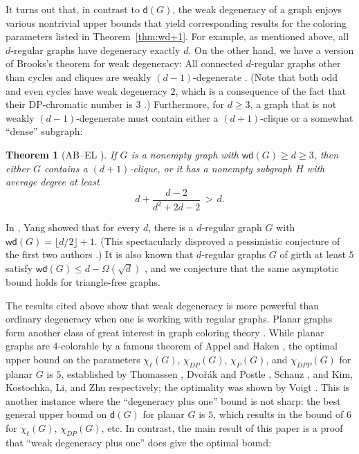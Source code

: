 \documentclass[11pt]{article}
\theoremstyle{slantthm}
\newtheorem{thm}{Theorem}[section]
\numberwithin{equation}{section}
\theoremstyle{definition}
\renewcommand{\epsilon}{\varepsilon}
\renewcommand{\leq}{\leqslant}
\renewcommand{\geq}{\geqslant}
\numberwithin{equation}{section}
\newcommand{\0}{\varnothing}
\newcommand{\de}{\mathsf{d}}
\newcommand{\wde}{\mathsf{wd}}
\begin{document}
    It turns out that, in contrast to $\de(G)$, the weak degeneracy of a graph enjoys various nontrivial upper bounds that yield corresponding results for the coloring parameters listed in Theorem~\ref{thm:wd+1}. For example, as mentioned above, all $d$-regular graphs have degeneracy exactly $d$. On the other hand, we have a version of Brooks's theorem for weak degeneracy: All connected $d$-regular graphs other than cycles and cliques are weakly $(d-1)$-degenerate \cite[Theorem 1.5]{WD}. (Note that both odd and even cycles have weak degeneracy $2$, which is a consequence of the fact that their DP-chromatic number is $3$ \cite{DP}.) Furthermore, for $d \geq 3$, a graph that is not weakly $(d-1)$-degenerate must contain either a $(d+1)$-clique or a somewhat ``dense'' subgraph: %

    \begin{thm}[{AB--EL \cite[Theorem 1.7]{WD}}]
        If $G$ is a nonempty graph with $\wde(G) \geq d \geq 3$, then either $G$ contains a $(d+1)$-clique, or it has a nonempty subgraph $H$ with average degree at least
        \[
            d + \frac{d - 2}{d^2 + 2d - 2} \,>\, d.
        \]
    \end{thm}

    In \cite{Regular}, Yang showed that for every $d$, there is a $d$-regular graph $G$ with $\wde(G) = \lfloor d/2 \rfloor + 1$. (This spectacularly disproved a pessimistic conjecture of the first two authors \cite[Conjecture 1.10]{WD}.) It is also known that $d$-regular graphs $G$ of girth at least $5$ satisfy $\wde(G) \leq d - \Omega(\sqrt{d})$ \cite[Theorem 1.12]{WD}, and we conjecture that the same asymptotic bound holds for triangle-free graphs.

    The results cited above show that weak degeneracy is more powerful than ordinary degeneracy when one is working with regular graphs. Planar graphs form another class of great interest in graph coloring theory \cites[\S10]{BondyMurty}[\S4]{Diestel}. While planar graphs are $4$-colorable by a famous theorem of Appel and Haken \cite{appel1989every,4CTNewProof,4CTFormal}, the optimal upper bound on the parameters $\chi_\ell(G)$, $\chi_{DP}(G)$, $\chi_P(G)$, and $\chi_{DPP}(G)$ for planar $G$ is $5$, established by Thomassen \cite{Thom}, Dvo\v{r}\'ak and Postle \cite{DP}, Schauz \cite{Schauz}, and Kim, Kostochka, Li, and Zhu \cite{Paint} respectively; the optimality was shown by Voigt \cite{Voigt}. This is another instance where the ``degeneracy plus one'' bound is not sharp: the best general upper bound on $\de(G)$ for planar $G$ is $5$, which results in the bound of $6$ for $\chi_\ell(G)$, $\chi_{DP}(G)$, etc. In contrast, the main result of this paper is a proof that ``weak degeneracy plus one'' does give the optimal bound:
\end{document}
